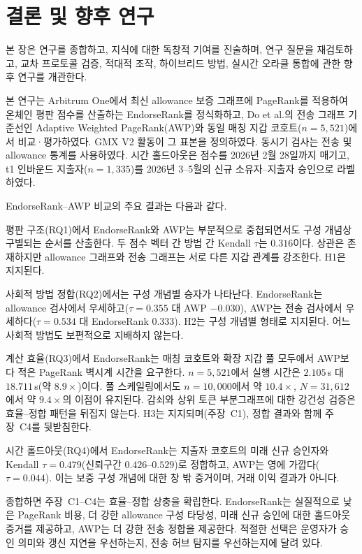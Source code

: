 ﻿%
\chapter{결론 및 향후 연구}
\label{ch:conclusion}

본 장은 연구를 종합하고, 지식에 대한 독창적 기여를 진술하며, 연구 질문을 재검토하고, 교차 프로토콜 검증, 적대적 조작, 하이브리드 방법, 실시간 오라클 통합에 관한 향후 연구를 개관한다.


본 연구는 Arbitrum One에서 최신 allowance 보증 그래프에 PageRank를 적용하여 온체인 평판 점수를 산출하는 EndorseRank를 정식화하고, Do et al.의 전송 그래프 기준선인 Adaptive Weighted PageRank(AWP)와 동일 매칭 지갑 코호트($n=5{,}521$)에서 비교·평가하였다. GMX V2 활동이 그 표본을 정의하였다. 동시기 검사는 전송 및 allowance 통계를 사용하였다. 시간 홀드아웃은 점수를 2026년 2월 28일까지 매기고, t1 인바운드 지출자($n=1{,}335$)를 2026년 3--5월의 신규 소유자--지출자 승인으로 라벨하였다.

EndorseRank--AWP 비교의 주요 결과는 다음과 같다.

평판 구조(RQ1)에서 EndorseRank와 AWP는 부분적으로 중첩되면서도 구성 개념상 구별되는 순서를 산출한다. 두 점수 벡터 간 방법 간 Kendall $\tau$는 $0.316$이다. 상관은 존재하지만 allowance 그래프와 전송 그래프는 서로 다른 지갑 관계를 강조한다. H1은 지지된다.

사회적 방법 정합(RQ2)에서는 구성 개념별 승자가 나타난다. EndorseRank는 allowance 검사에서 우세하고($\tau=0.355$ 대 AWP $-0.030$), AWP는 전송 검사에서 우세하다($\tau=0.534$ 대 EndorseRank $0.333$). H2는 구성 개념별 형태로 지지된다. 어느 사회적 방법도 보편적으로 지배하지 않는다.

계산 효율(RQ3)에서 EndorseRank는 매칭 코호트와 확장 지갑 풀 모두에서 AWP보다 적은 PageRank 벽시계 시간을 요구한다. $n=5{,}521$에서 실행 시간은 $2.105$\,s 대 $18.711$\,s(약 $8.9\times$)이다. 풀 스케일링에서도 $n=10{,}000$에서 약 $10.4\times$, $N=31{,}612$에서 약 $9.4\times$의 이점이 유지된다. 감쇠와 상위 토큰 부분그래프에 대한 강건성 검증은 효율--정합 패턴을 뒤집지 않는다. H3는 지지되며(주장~C1), 정합 결과와 함께 주장~C4를 뒷받침한다.

시간 홀드아웃(RQ4)에서 EndorseRank는 지출자 코호트의 미래 신규 승인자와 Kendall $\tau=0.479$(신뢰구간 $0.426$--$0.529$)로 정합하고, AWP는 영에 가깝다($\tau=0.044$). 이는 보증 구성 개념에 대한 창 밖 증거이며, 거래 이익 결과가 아니다.

종합하면 주장~C1--C4는 효율--정합 상충을 확립한다. EndorseRank는 실질적으로 낮은 PageRank 비용, 더 강한 allowance 구성 타당성, 미래 신규 승인에 대한 홀드아웃 증거를 제공하고, AWP는 더 강한 전송 정합을 제공한다. 적절한 선택은 운영자가 승인 의미와 갱신 지연을 우선하는지, 전송 허브 탐지를 우선하는지에 달려 있다.

